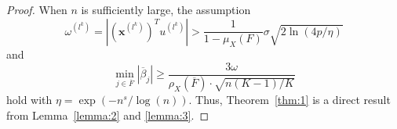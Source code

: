\documentclass[11pt,review,authoryear]{elsarticle}
\begin{document}
\begin{appendices}
\begin{proof}
  When $n$ is sufficiently large, the assumption 
  \[
      \omega^{\left(l^k \right)} = \left\vert \left( \mathbf{x}^{\left( l^k \right)}\right) ^T u^{\left(l^{k}\right)} \right\vert >\frac{1}{1-\mu_{X}\left(F\right)}\sigma\sqrt{2\ln\left(4p/\eta\right)}
  \] 
  and
  \[
      \min_{j\in\overline{F}}\left|\overline{\beta}_{j}\right|\geqslant\frac{3\omega}{\rho_{X}\left(\overline{F}\right)\cdot\sqrt{n\left(K-1\right)/K}}
  \]
  hold with $\eta = \exp\left(-n^s/\log(n)\right)$. Thus, Theorem~\ref{thm:1} is a direct result from Lemma~\ref{lemma:2} and \ref{lemma:3}.
\end{proof}


\end{appendices}
\end{document}
